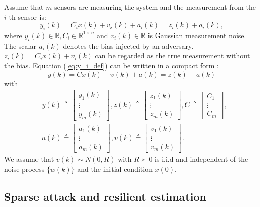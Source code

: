 \documentclass[journal]{IEEEtran}
\begin{document}
	Assume that $m$ sensors are measuring the system and the measurement from the $i$ th sensor is:
	\begin{equation}\label{eq:y_i_def}
		y_{i}(k)=C_{i} x(k)+v_{i}(k)+a_{i}(k)=z_{i}(k)+a_{i}(k), 
	\end{equation}
	where $y_{i}(k) \in \mathbb{R}, C_{i} \in \mathbb{R}^{1 \times n}$ and $v_{i}(k) \in \mathbb{R}$ is Gaussian
	measurement noise. The scalar $a_{i}(k)$ denotes the bias injected by an adversary. $z_{i}(k)=C_{i} x(k)+v_{i}(k)$ can be regarded as the true measurement without the bias.
	Equation (\ref{eq:y_i_def}) can be written in a compact form :
	\begin{equation}\label{eq:y_def}
		y(k)=C x(k)+v(k)+a(k)=z(k)+a(k)
	\end{equation}
	with
	\begin{align}
		&y(k) \triangleq\begin{bmatrix}
			y_{1}(k) \\
			\vdots \\
			y_{m}(k)
		\end{bmatrix}  ,
		z(k) \triangleq\begin{bmatrix}
			z_{1}(k) \\
			\vdots \\
			z_{m}(k)
		\end{bmatrix}  ,
		C \triangleq\begin{bmatrix}
			C_{1} \\
			\vdots \\
			C_{m}
		\end{bmatrix} , \\
		&a(k)  \triangleq\begin{bmatrix}
			a_{1}(k) \\
			\vdots \\
			a_{m}(k)
		\end{bmatrix}  ,
		v(k) \triangleq\begin{bmatrix}
			v_{1}(k) \\
			\vdots \\
			v_{m}(k)
		\end{bmatrix}.
	\end{align}
	We assume that $v(k) \sim {N}(0, R)$ with $R\succ 0$ is i.i.d and independent of the noise process $\{w(k)\}$ and the initial condition $x(0)$.
	
	\subsection{Sparse attack and resilient estimation}
	
\end{document}
